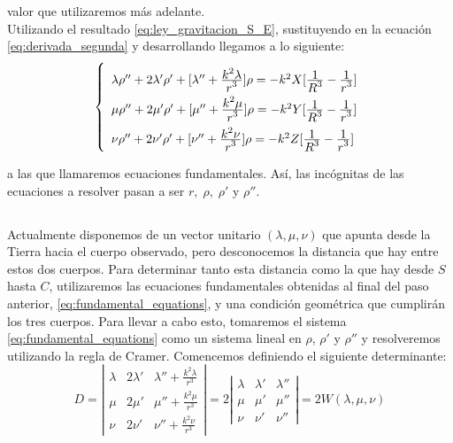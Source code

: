 \documentclass[11pt]{article}
\newcommand\ddfrac[2]{\frac{\displaystyle #1}{\displaystyle #2}}
\begin{document}
\noindent valor que utilizaremos más adelante.\\

Utilizando el resultado \eqref{eq:ley_gravitacion_S_E}, sustituyendo en la ecuación \eqref{eq:derivada_segunda} y desarrollando llegamos a lo siguiente:
\begin{align}
\left\{
\def\arraystretch{2}
\begin{array}{l}
	\lambda\rho''+2\lambda'\rho'+[\lambda''+\ddfrac{k^2\lambda}{r^3}]\rho=-k^2X[\ddfrac{1}{R^3}-\ddfrac{1}{r^3}]\\
	\mu\rho''+2\mu'\rho'+[\mu''+\ddfrac{k^2\mu}{r^3}]\rho=-k^2Y[\ddfrac{1}{R^3}-\ddfrac{1}{r^3}]\\
	\nu\rho''+2\nu'\rho'+[\nu''+\ddfrac{k^2\nu}{r^3}]\rho=-k^2Z[\ddfrac{1}{R^3}-\ddfrac{1}{r^3}]
\end{array}
\right.
\label{eq:fundamental_equations}
\end{align}

\noindent a las que llamaremos ecuaciones fundamentales. Así, las incógnitas de las ecuaciones a resolver pasan a ser $r, \; \rho, \; \rho'$ y $\rho''$.\\



\subsection{}
\label{subsec:distancias}
Actualmente disponemos de un vector unitario $(\lambda,\mu,\nu)$ que apunta desde la Tierra hacia el cuerpo observado, pero desconocemos la distancia que hay entre estos dos cuerpos. Para determinar tanto esta distancia como la que hay desde $S$ hasta $C$, utilizaremos las ecuaciones fundamentales obtenidas al final del paso anterior, \eqref{eq:fundamental_equations}, y una condición geométrica que cumplirán los tres cuerpos. Para llevar a cabo esto, tomaremos el sistema \eqref{eq:fundamental_equations} como un sistema lineal en $\rho$, $\rho'$ y $\rho''$ y resolveremos utilizando la regla de Cramer. Comencemos definiendo el siguiente determinante:
\[
D =
\left|
\begin{array}{ccc}
	\lambda & 2\lambda' & \lambda''+\frac{k^2\lambda}{r^3}\\
	\mu & 2\mu' & \mu''+\frac{k^2\mu}{r^3}\\
	\nu & 2\nu' & \nu''+\frac{k^2\nu}{r^3}
\end{array}
\right|
=
2
\left|
\begin{array}{ccc}
	\lambda & \lambda' & \lambda''\\
	\mu & \mu' & \mu''\\
	\nu & \nu' & \nu''
\end{array}
\right|
=2W(\lambda,\mu,\nu)
\]
\end{document}
